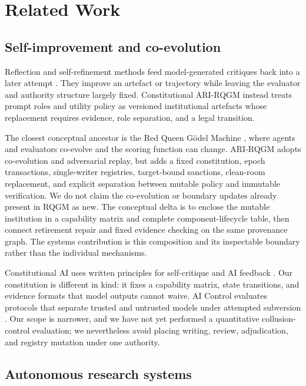 \section{Related Work}\label{sec:related}

\subsection{Self-improvement and co-evolution}\label{sec:related:treesearch}

Reflection and self-refinement methods feed model-generated critiques back
into a later attempt \cite{madaan2023self,shinn2023reflexion}. They improve
an artefact or trajectory while leaving the evaluator and authority
structure largely fixed. Constitutional ARI-RQGM instead treats prompt
roles and utility policy as versioned institutional artefacts whose
replacement requires evidence, role separation, and a legal transition.

The closest conceptual ancestor is the Red Queen G\"odel Machine
\cite{iacob2026red}, where agents and evaluators co-evolve and the scoring
function can change. ARI-RQGM adopts co-evolution and adversarial replay,
but adds a fixed constitution, epoch transactions, single-writer
registries, target-bound sanctions, clean-room replacement, and explicit
separation between mutable policy and immutable verification. We do not
claim the co-evolution or boundary updates already present in RQGM as new.
The conceptual delta is to enclose the mutable institution in a capability
matrix and complete component-lifecycle table, then connect retirement repair and
fixed evidence checking on the same provenance graph. The systems
contribution is this composition and its inspectable boundary rather than
the individual mechanisms.

Constitutional AI uses written principles for self-critique and AI
feedback \cite{bai2022constitutional}. Our constitution is different in
kind: it fixes a capability matrix, state transitions, and evidence
formats that model outputs cannot waive. AI Control evaluates protocols
that separate trusted and untrusted models under attempted subversion
\cite{greenblatt2023ai}. Our scope is narrower, and we have not yet
performed a quantitative collusion-control evaluation; we nevertheless
avoid placing writing, review, adjudication, and registry mutation under
one authority.

\subsection{Autonomous research systems}\label{sec:related:autonomous}

